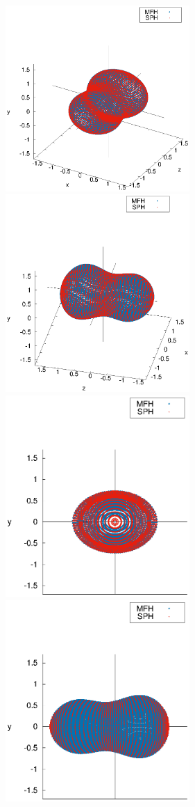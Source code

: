 \documentclass[a4paper,polish]{article}
\numberwithin{equation}{section}
\begin{document}
\vspace*{\fill}
\begin{figure}[ht!]
    \centering
    \includegraphics[width=7cm]{rys1.eps}    
    \includegraphics[width=7cm]{rys2.eps}\\    
    \vspace{1.5cm}    
    \includegraphics[width=7cm]{rys3.eps}
    \includegraphics[width=7cm]{rys4.eps}\\

\end{figure}
\end{document}
